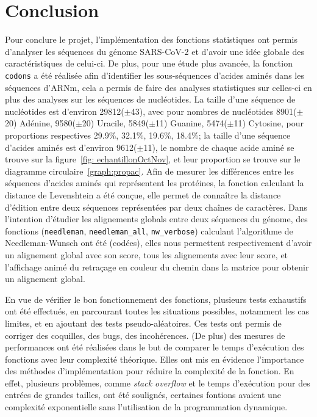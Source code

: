 \documentclass[12pt]{article}
\begin{document}
\section*{Conclusion}
    Pour conclure le projet, l'implémentation des fonctions statistiques ont permis d'analyser les séquences du génome SARS-CoV-2 et d'avoir une idée globale des caractéristiques de celui-ci. De plus, pour une étude plus avancée, la fonction \texttt{codons} a été réalisée afin d'identifier les sous-séquences d'acides aminés dans les séquences d'ARNm, cela a permis de faire des analyses statistiques sur celles-ci en plus des analyses sur les séquences de nucléotides. La taille d'une séquence de nucléotides est d'environ 29812($\pm$43), avec pour nombres de nucléotides 8901($\pm$20) Adénine, 9580($\pm$20) Uracile, 5849($\pm$11) Guanine, 5474($\pm$11) Cytosine, pour proportions respectives 29.9\%, 32.1\%, 19.6\%, 18.4\%; la taille d'une séquence d'acides aminés est d'environ 9612($\pm$11), le nombre de chaque acide aminé se trouve sur la figure~\ref{fig: echantillonOctNov}, et leur proportion se trouve sur le diagramme circulaire~\ref{graph:propac}. Afin de mesurer les différences entre les séquences d'acides aminés qui représentent les protéines, la fonction calculant la distance de Levenshtein a été conçue, elle permet de connaître la distance d'édition entre deux séquences représentées par deux chaînes de caractères. Dans l'intention d'étudier les alignements globals entre deux séquences du génome, des fonctions (\texttt{needleman}, \texttt{needleman\_all}, \texttt{nw\_verbose}) calculant l'algorithme de Needleman-Wunsch ont été (codées), elles nous permettent respectivement d'avoir un alignement global avec son score, tous les alignements avec leur score, et l'affichage animé du retraçage en couleur du chemin dans la matrice pour obtenir un alignement global.
    
    En vue de vérifier le bon fonctionnement des fonctions, plusieurs tests exhaustifs ont été effectués, en parcourant toutes les situations possibles, notamment les cas limites, et en ajoutant des tests pseudo-aléatoires. Ces tests ont permis de corriger des coquilles, des bugs, des incohérences. (De plus) des mesures de performances ont été réalisées dans le but de comparer le temps d'exécution des fonctions avec leur complexité théorique. Elles ont mis en évidence l'importance des méthodes d'implémentation pour réduire la complexité de la fonction. En effet, plusieurs problèmes, comme \textsl{stack overflow} et le temps d'exécution pour des entrées de grandes tailles, ont été soulignés, certaines fontions avaient une complexité exponentielle sans l'utilisation de la programmation dynamique.
    
\end{document}
